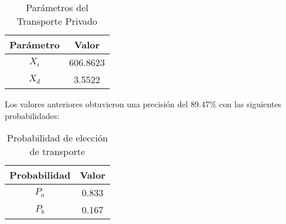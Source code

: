 \begin{table}[H]
    \centering
    \caption{Parámetros del Transporte Privado}
    \begin{tabular}{|c|c|}
    \hline
    Parámetro & Valor  \\ \hline
    $X_i$    & 606.8623     \\ \hline
    $X_{d}$    & 3.5522     \\ \hline
    \end{tabular}
    \label{tab:param}
\end{table}


Los valores anteriores obtuvieron una precisión del 89.47\% con las siguientes probabilidades:

\begin{table}[H]
    \centering
    \caption{Probabilidad de elección de transporte}
    \begin{tabular}{|c|c|}
    \hline
    Probabilidad & Valor  \\ \hline
    $P_{a}$    & 0.833    \\ \hline
    $P_{b}$    & 0.167     \\ \hline
    \end{tabular}
    \label{tab:prob}
\end{table}

